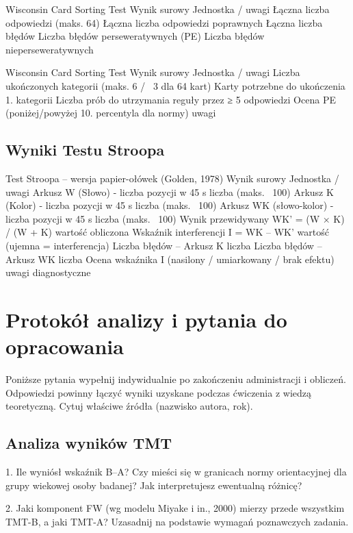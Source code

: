 \documentclass[11pt,a4paper]{article}
\begin{document}
Wisconsin Card Sorting Test 
Wynik surowy Jednostka / uwagi
Łączna liczba odpowiedzi (maks. 64)
Łączna liczba odpowiedzi poprawnych 
Łączna liczba błędów 
Liczba błędów perseweratywnych (PE)  %
Liczba błędów nieperseweratywnych 

Wisconsin Card Sorting Test 
Wynik surowy Jednostka / uwagi
Liczba ukończonych kategorii (maks. 6 / ~3 dla 64 kart) 
Karty potrzebne do ukończenia 1. kategorii 
Liczba prób do utrzymania reguły przez ≥ 5 odpowiedzi 
Ocena PE (poniżej/powyżej 10. percentyla dla normy) uwagi 

\subsection{Wyniki Testu Stroopa}

Test Stroopa – wersja papier-ołówek (Golden, 1978) Wynik surowy Jednostka / uwagi
Arkusz W (Słowo) - liczba pozycji w 45 s liczba (maks. ~100)
Arkusz K (Kolor) - liczba pozycji w 45 s liczba (maks. ~100)
Arkusz WK (słowo-kolor) - liczba pozycji w 45 s liczba (maks. ~100)
Wynik przewidywany WK' = (W × K) / (W + K) wartość obliczona
Wskaźnik interferencji I = WK – WK' wartość (ujemna = interferencja)
Liczba błędów – Arkusz K liczba
Liczba błędów – Arkusz WK liczba
Ocena wskaźnika I (nasilony / umiarkowany / brak efektu) uwagi diagnostyczne

\section{Protokół analizy i pytania do opracowania}

Poniższe pytania wypełnij indywidualnie po zakończeniu administracji i obliczeń. Odpowiedzi powinny łączyć wyniki uzyskane podczas ćwiczenia z wiedzą teoretyczną. Cytuj właściwe źródła (nazwisko autora, rok).

\subsection{Analiza wyników TMT}

1. Ile wyniósł wskaźnik B–A? Czy mieści się w granicach normy orientacyjnej dla grupy wiekowej osoby badanej? Jak interpretujesz ewentualną różnicę?
\vspace{0.6em}

2. Jaki komponent FW (wg modelu Miyake i in., 2000) mierzy przede wszystkim TMT-B, a jaki TMT-A? Uzasadnij na podstawie wymagań poznawczych zadania.
\vspace{0.6em}
\end{document}
